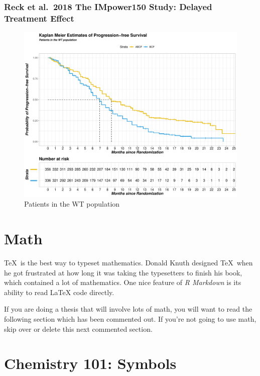 \documentclass[12pt,twoside]{reedthesis}
\begin{document}
\hypertarget{reck-et-al.-2018-the-impower150-study-delayed-treatment-effect}{%
\subsubsection{Reck et al.~2018 The IMpower150 Study: Delayed Treatment Effect}\label{reck-et-al.-2018-the-impower150-study-delayed-treatment-effect}}
\begin{figure}

{\centering \includegraphics[scale=0.55]{figure/reck} 

}

\caption{Patients in the WT population}\label{fig:unnamed-chunk-13}
\end{figure}
\hypertarget{math}{%
\section{Math}\label{math}}

\TeX~is the best way to typeset mathematics. Donald Knuth designed \TeX~when he got frustrated at how long it was taking the typesetters to finish his book, which contained a lot of mathematics. One nice feature of \emph{R Markdown} is its ability to read LaTeX code directly.

If you are doing a thesis that will involve lots of math, you will want to read the following section which has been commented out. If you're not going to use math, skip over or delete this next commented section.

\hypertarget{chemistry-101-symbols}{%
\section{Chemistry 101: Symbols}\label{chemistry-101-symbols}}
\end{document}
